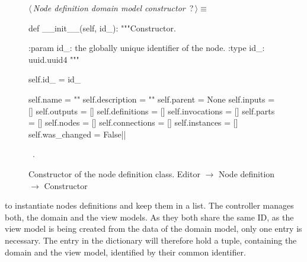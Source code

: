 \documentclass[%
    a4paper,    %
    justified,  %
    nobib,      %
    openany     %
]{tufte-book}
\makeatletter
\renewcommand{\label}[1]{\@tufte@label{##1}}%
\makeatother
\begin{document}
\begin{figure}
\begin{flushleft} \small
\begin{minipage}{\linewidth}\label{scrap121}\raggedright\small
{} $\langle\,${\itshape Node definition domain model constructor}\nobreak\ {\footnotesize {?}}$\,\rangle\equiv$
\vspace{-1ex}
\begin{pythoncode}
def __init__(self, id_):
    """Constructor.

    :param id_: the globally unique identifier of the node.
    :type  id_: uuid.uuid4
    """

    self.id_         = id_

    self.name        = ""
    self.description = ""
    self.parent      = None
    self.inputs      = []
    self.outputs     = []
    self.definitions = []
    self.invocations = []
    self.parts       = []
    self.nodes       = []
    self.connections = []
    self.instances   = []
    self.was_changed = False|\NWsep|
\end{pythoncode}
\vspace{1.5ex}
\footnotesize
\begin{list}{}{\setlength{\itemsep}{-\parsep}\setlength{\itemindent}{-\leftmargin}}
\item \NWtxtMacroRefIn\ .

\item{}
\end{list}
\end{minipage}\vspace{4ex}
\end{flushleft}
\caption{Constructor of the node definition class.
  \newline{}\newline{}Editor $\rightarrow$ Node definition $\rightarrow$
  Constructor}
\label{editor:lst:node-definition:constructor}
\end{figure}

 to instantiate nodes definitions
and keep them in a list. The controller manages both, the domain and the view
models. As they both share the same ID, as the view model is being created from
the data of the domain model, only one entry is necessary. The entry in the
dictionary will therefore hold a tuple, containing the domain and the view
model, identified by their common identifier.
\end{document}
